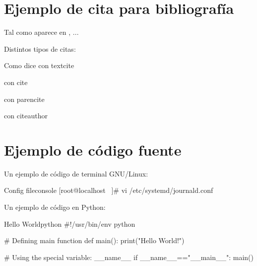 \documentclass{\ClassPath/viu-tfm-template}
\begin{document}
    \coverpage

    \tableofcontents

    \chapter{Ejemplo de cita para bibliografía}
    Tal como aparece en \textcite{einstein}, ...

    Distintos tipos de citas:

    Como dice \textcite{Xanthopoulos} con textcite

    \cite{Xanthopoulos}  con cite

    \parencite{Xanthopoulos} con parencite

    \citeauthor{Xanthopoulos} con citeauthor

    \chapter{Ejemplo de código fuente}
    Un ejemplo de código de terminal GNU/Linux:

\begin{mycode}{Config file}{console}{}
[root@localhost ~]# vi /etc/systemd/journald.conf
\end{mycode}


    Un ejemplo de código en Python:

\begin{mycode}{Hello World}{python}{}
#!/usr/bin/env python

# Defining main function
def main():
    print("Hello World!")

# Using the special variable: __name__
if __name__=="__main__":
    main()
\end{mycode}
\end{document}
